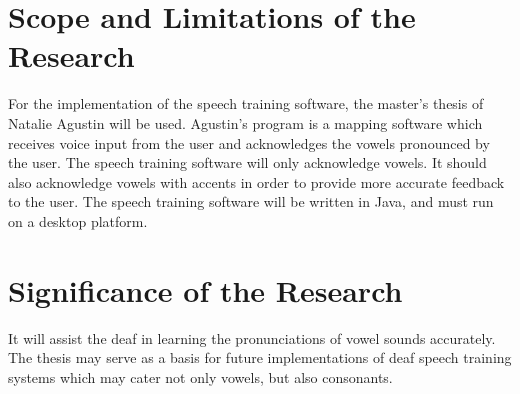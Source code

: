 \section{Scope and Limitations of the Research}
\label{sec:scopelimitations}

For the implementation of the speech training software, the master's thesis of Natalie Agustin \citeyear{agustin:2014:SOM} will be used. Agustin's program is a mapping software which receives voice input from the user and acknowledges the vowels pronounced by the user.
The speech training software will only acknowledge vowels. It should also acknowledge vowels with accents in order to provide more accurate feedback to the user.
The speech training software will be written in Java, and must run on a desktop platform.

\section{Significance of the Research}
\label{sec:significance}

It will assist the deaf in learning the pronunciations of vowel sounds accurately.
The thesis may serve as a basis for future implementations of deaf speech training systems which may cater not only vowels, but also consonants.